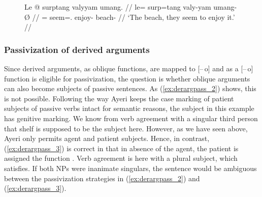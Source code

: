 \begin{figure}[h]
\ex\label{ex:raisept}\begingl
	\gla Le @ surptang valyyam umang. //
	\glb le= surp=tang valy-yam umang-Ø //
	\glc \PatTI{}= seem=\TplM.\Aarg{} enjoy-\Ptcp{} beach-\Top{} //
	\glft `The beach, they seem to enjoy it.' //
\endgl\xe
\end{figure}


\subsubsection{Passivization of derived arguments}

Since derived arguments, as oblique functions, are mapped to \mbox{[–\,o]} and
\Subj{} as a [\mbox{–\,o}] function is eligible for passivization, the question is
whether oblique arguments can also become subjects of passive sentences. As
(\ref{ex:derargpass_2}) shows, this is not possible. Following the way Ayeri
keeps the case marking of patient subjects of passive verbs intact for semantic
reasons, the subject in this example has genitive marking. We know from verb
agreement with a singular third person that  {shelf} is
supposed to be the subject here. However, as we have seen above, Ayeri only
permits agent and patient subjects. Hence, in contrast, (\ref{ex:derargpass_3})
is correct in that in absence of the agent, the patient is assigned the \Subj{}
function \citep[334]{bresnan2016}. Verb agreement is here with a plural
subject, which  satisfies. If both NPs were
inanimate singulars, the sentence would be ambiguous between the passivization
strategies in (\ref{ex:derargpass_2}) and (\ref{ex:derargpass_3}).

